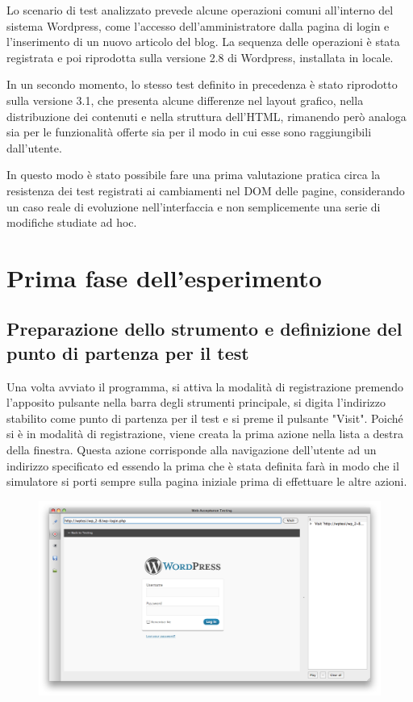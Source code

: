 Lo scenario di test analizzato prevede alcune operazioni comuni all'interno del sistema Wordpress, come l'accesso dell'amministratore dalla pagina di login e l'inserimento di un nuovo articolo del blog. La sequenza delle operazioni è stata registrata e poi riprodotta sulla versione 2.8 di Wordpress, installata in locale. 

In un secondo momento, lo stesso test definito in precedenza è stato riprodotto sulla versione 3.1, che presenta alcune differenze nel layout grafico, nella distribuzione dei contenuti e nella struttura dell'HTML, rimanendo però analoga sia per le funzionalità offerte sia per il modo in cui esse sono raggiungibili dall'utente. 

In questo modo è stato possibile fare una prima valutazione pratica circa la resistenza dei test registrati ai cambiamenti nel DOM delle pagine, considerando un caso reale di evoluzione nell'interfaccia e non semplicemente una serie di modifiche studiate ad hoc.

\section{Prima fase dell'esperimento}

\subsection{Preparazione dello strumento e definizione del punto di partenza per il test}

Una volta avviato il programma, si attiva la modalità di registrazione premendo l'apposito pulsante nella barra degli strumenti principale, si digita l'indirizzo stabilito come punto di partenza per il test e si preme il pulsante "Visit". Poiché si è in modalità di registrazione, viene creata la prima azione nella lista a destra della finestra. Questa azione corrisponde alla navigazione dell'utente ad un indirizzo specificato ed essendo la prima che è stata definita farà in modo che il simulatore si porti sempre sulla pagina iniziale prima di effettuare le altre azioni.

\begin{figure}[htbp]
\begin{center}
\includegraphics[width=\textwidth]{images/wp_tour/1_login.png}
\end{center}
\end{figure}
 

